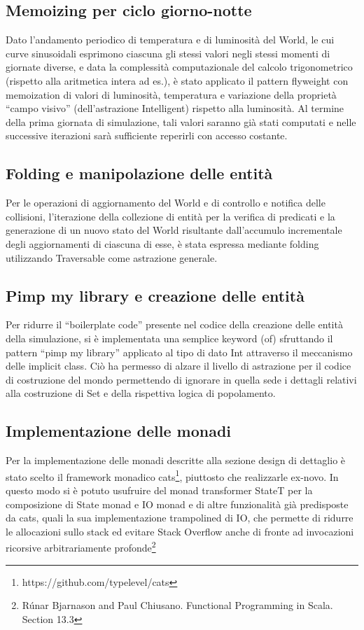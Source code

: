 \subsection{Memoizing per ciclo giorno-notte}
Dato l’andamento periodico di temperatura e di luminosità del World, le cui curve sinusoidali esprimono ciascuna gli stessi valori negli stessi momenti di giornate diverse, e data la complessità computazionale del calcolo trigonometrico (rispetto alla aritmetica intera ad es.), è stato applicato il pattern flyweight con memoization di valori di luminosità, temperatura e variazione della proprietà “campo visivo” (dell’astrazione Intelligent) rispetto alla luminosità. Al termine della prima giornata di simulazione, tali valori saranno già stati computati e nelle successive iterazioni sarà sufficiente reperirli con accesso costante.

\subsection{Folding e manipolazione delle entità}
Per le operazioni di aggiornamento del World e di controllo e notifica delle collisioni, l’iterazione della collezione di entità per la verifica di predicati e la generazione di un nuovo stato del World risultante dall’accumulo incrementale degli aggiornamenti di ciascuna di esse, è stata espressa mediante folding utilizzando Traversable come astrazione generale.

\subsection{Pimp my library e creazione delle entità}
Per ridurre il “boilerplate code” presente nel codice della creazione delle entità della simulazione, si è implementata una semplice keyword (of) sfruttando il pattern “pimp my library” applicato al tipo di dato Int attraverso il meccanismo delle implicit class. Ciò ha permesso di alzare il livello di astrazione per il codice di costruzione del mondo permettendo di ignorare in quella sede i dettagli relativi alla costruzione di Set e della rispettiva logica di popolamento.

\subsection{Implementazione delle monadi}
Per la implementazione delle monadi descritte alla sezione design di dettaglio è stato scelto il framework monadico cats\footnote{https://github.com/typelevel/cats}, piuttosto che realizzarle ex-novo. In questo modo si è potuto usufruire del monad transformer StateT per la composizione di State monad e IO monad e di altre funzionalità già predisposte da cats, quali la sua implementazione trampolined di IO, che permette di ridurre le allocazioni sullo stack ed evitare Stack Overflow anche di fronte ad invocazioni ricorsive arbitrariamente profonde\footnote{Rúnar Bjarnason and Paul Chiusano. Functional Programming in Scala. Section 13.3}


